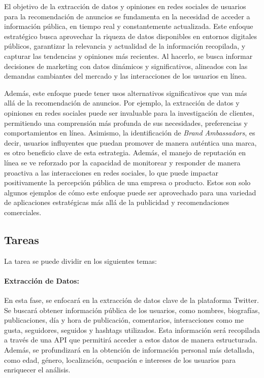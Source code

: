 \documentclass[
  letterpaper,
  DIV=11,
  numbers=noendperiod]{scrartcl}
\let\oldparagraph\paragraph
\renewcommand{\paragraph}[1]{\oldparagraph{#1}\mbox{}}
\begin{document}
El objetivo de la extracción de datos y opiniones en redes sociales de
usuarios para la recomendación de anuncios se fundamenta en la necesidad
de acceder a información pública, en tiempo real y constantemente
actualizada. Este enfoque estratégico busca aprovechar la riqueza de
datos disponibles en entornos digitales públicos, garantizar la
relevancia y actualidad de la información recopilada, y capturar las
tendencias y opiniones más recientes. Al hacerlo, se busca informar
decisiones de marketing con datos dinámicos y significativos, alineados
con las demandas cambiantes del mercado y las interacciones de los
usuarios en línea.

Además, este enfoque puede tener usos alternativos significativos que
van más allá de la recomendación de anuncios. Por ejemplo, la extracción
de datos y opiniones en redes sociales puede ser invaluable para la
investigación de clientes, permitiendo una comprensión más profunda de
sus necesidades, preferencias y comportamientos en línea. Asimismo, la
identificación de \emph{Brand Ambassadors}, es decir, usuarios
influyentes que puedan promover de manera auténtica una marca, es otro
beneficio clave de esta estrategia. Además, el manejo de reputación en
línea se ve reforzado por la capacidad de monitorear y responder de
manera proactiva a las interacciones en redes sociales, lo que puede
impactar positivamente la percepción pública de una empresa o producto.
Estos son solo algunos ejemplos de cómo este enfoque puede ser
aprovechado para una variedad de aplicaciones estratégicas más allá de
la publicidad y recomendaciones comerciales.

\subsection{Tareas}\label{tareas}

La tarea se puede dividir en los siguientes temas:

\paragraph{Extracción de Datos:}\label{extracciuxf3n-de-datos}

En esta fase, se enfocará en la extracción de datos clave de la
plataforma Twitter. Se buscará obtener información pública de los
usuarios, como nombres, biografías, publicaciones, día y hora de
publicación, comentarios, interacciones como me gusta, seguidores,
seguidos y hashtags utilizados. Esta información será recopilada a
través de una API que permitirá acceder a estos datos de manera
estructurada. Además, se profundizará en la obtención de información
personal más detallada, como edad, género, localización, ocupación e
intereses de los usuarios para enriquecer el análisis.
\end{document}
